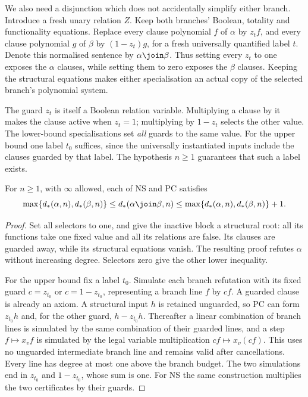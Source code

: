 We also need a disjunction which does not accidentally simplify either
branch. Introduce a fresh unary relation $Z$. Keep both branches' Boolean,
totality and functionality equations. Replace every clause polynomial $f$
of $\alpha$ by $z_t f$, and every clause polynomial $g$ of $\beta$ by
$(1-z_t)g$, for a fresh universally quantified label $t$. Denote this
normalised sentence by $\alpha\join\beta$.
Thus setting every $z_t$ to one exposes the $\alpha$ clauses, while
setting them to zero exposes the $\beta$ clauses. Keeping the structural
equations makes either specialisation an actual copy of the selected
branch's polynomial system.

The guard $z_t$ is itself a Boolean relation variable. Multiplying a
clause by it makes the clause active when $z_t=1$; multiplying by
$1-z_t$ selects the other value. The lower-bound specialisations set
\emph{all} guards to the same value. For the upper bound one label
$t_0$ suffices, since the universally instantiated inputs include the
clauses guarded by that label. The hypothesis $n\ge1$ guarantees that
such a label exists.

\begin{lemma}\label{tx:lem:join}
For $n\ge1$, with $\infty$ allowed, each of NS and PC satisfies
\[
 \max\{d_*(\alpha,n),d_*(\beta,n)\}
 \le d_*(\alpha\join\beta,n)
 \le\max\{d_*(\alpha,n),d_*(\beta,n)\}+1.
\]
\end{lemma}
\begin{proof}
Set all selectors to one, and give the inactive block a structural root:
all its functions take one fixed value and all its relations are false.
Its clauses are guarded away, while its structural equations vanish.
The resulting proof refutes $\alpha$ without increasing degree. Selectors
zero give the other lower inequality.

For the upper bound fix a label $t_0$. Simulate each branch refutation
with its fixed guard $c=z_{t_0}$ or $c=1-z_{t_0}$, representing a branch
line $f$ by $cf$. A guarded clause is already an axiom. A structural
input $h$ is retained unguarded, so PC can form $z_{t_0}h$ and,
for the other guard, $h-z_{t_0}h$. Thereafter a linear combination of
branch lines is simulated by the same combination of their guarded
lines, and a step $f\mapsto x_vf$ is simulated by the legal variable
multiplication $cf\mapsto x_v(cf)$. This uses no unguarded intermediate
branch line and remains valid after cancellations. Every line has
degree at most one above the branch budget. The two simulations end
in $z_{t_0}$ and $1-z_{t_0}$, whose sum is one. For NS the same
construction multiplies the two certificates by their guards.
\end{proof}

